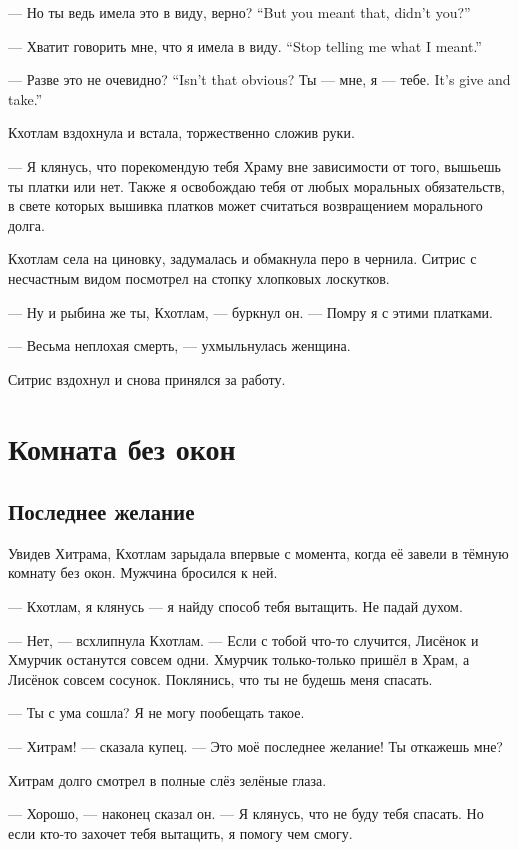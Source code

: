 {--- Но ты ведь имела это в виду, верно?}
{``But you meant that, didn't you?''}

{--- Хватит говорить мне, что я имела в виду.}
{``Stop telling me what I meant.''}

{--- Разве это не очевидно?}
{``Isn't that obvious?}
{Ты --- мне, я --- тебе.}
{It's give and take.''}

Кхотлам вздохнула и встала, торжественно сложив руки.

--- Я клянусь, что порекомендую тебя Храму вне зависимости от того, вышьешь ты платки или нет.
Также я освобождаю тебя от любых моральных обязательств, в свете которых вышивка платков может считаться возвращением морального долга.

Кхотлам села на циновку, задумалась и обмакнула перо в чернила.
Ситрис с несчастным видом посмотрел на стопку хлопковых лоскутков.

--- Ну и рыбина же ты, Кхотлам, --- буркнул он.
--- Помру я с этими платками.

--- Весьма неплохая смерть, --- ухмыльнулась женщина.

Ситрис вздохнул и снова принялся за работу.

\chapter{Комната без окон}

\section{Последнее желание}

Увидев Хитрама, Кхотлам зарыдала впервые с момента, когда её завели в тёмную комнату без окон.
Мужчина бросился к ней.

--- Кхотлам, я клянусь --- я найду способ тебя вытащить.
Не падай духом.

--- Нет, --- всхлипнула Кхотлам.
--- Если с тобой что-то случится, Лисёнок и Хмурчик останутся совсем одни.
Хмурчик только-только пришёл в Храм, а Лисёнок совсем сосунок.
Поклянись, что ты не будешь меня спасать.

--- Ты с ума сошла?
Я не могу пообещать такое.

--- Хитрам! --- сказала купец.
--- Это моё последнее желание!
Ты откажешь мне?

Хитрам долго смотрел в полные слёз зелёные глаза.

--- Хорошо, --- наконец сказал он.
--- Я клянусь, что не буду тебя спасать.
Но если кто-то захочет тебя вытащить, я помогу чем смогу.

